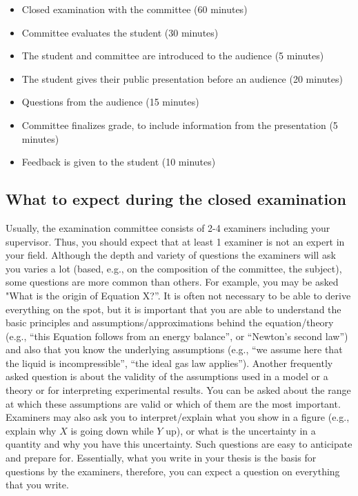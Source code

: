 \documentclass{article}
\begin{document}
\begin{itemize}
    \item Closed examination with the committee (60 minutes)
    \item Committee evaluates the student (30 minutes)
    \item The student and committee are introduced to the audience (5 minutes)
    \item The student gives their public presentation before an audience (20 minutes)
    \item Questions from the audience (15 minutes)
    \item Committee finalizes grade, to include information from the presentation (5 minutes)
    \item Feedback is given to the student (10 minutes)
\end{itemize}

\subsection{What to expect during the closed examination}
Usually, the examination committee consists of 2-4 examiners including your supervisor. Thus, you should expect that at least 1 examiner is not an expert in your field. Although the depth and variety of questions the examiners will ask you varies a lot (based, e.g., on the composition of the committee, the subject), some questions are more common than others. For example, you may be asked "What is the origin of Equation X?”. It is often not necessary to be able to derive everything on the spot, but it is important that you are able to understand the basic principles and assumptions/approximations behind the equation/theory (e.g., “this Equation follows from an energy balance”, or “Newton’s second law”) and also that you know the underlying assumptions (e.g., “we assume here that the liquid is incompressible”, “the ideal gas law applies”). Another frequently asked question is about the validity of the assumptions used in a model or a theory or for interpreting experimental results. You can be asked about the range at which these assumptions are valid or which of them are the most important. Examiners may also ask you to interpret/explain what you show in a figure (e.g., explain why $X$ is going down while $Y$ up), or what is the uncertainty in a quantity and why you have this uncertainty. Such questions are easy to anticipate and prepare for. Essentially, what you write in your thesis is the basis for questions by the examiners, therefore, you can expect a question on everything that you write.
\end{document}
